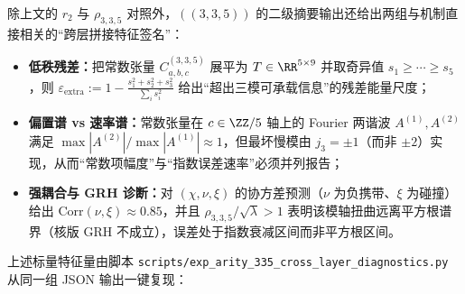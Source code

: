 \begin{remark}\label{rem:arity-335-cross-layer-diagnostics}
除上文的 \(r_2\) 与 \(\rho_{3,3,5}\) 对照外，\(((3,3,5))\) 的二级摘要输出还给出两组与机制直接相关的“跨层拼接特征签名”：
\begin{itemize}
  \item \textbf{低秩残差：}把常数张量 \(C^{(3,3,5)}_{a,b,c}\) 展平为 \(T\in\RR^{5\times 9}\) 并取奇异值 \(s_1\ge\cdots\ge s_5\)，则
  \(
  \varepsilon_{\mathrm{extra}}
  :=1-\frac{s_1^2+s_2^2+s_3^2}{\sum_i s_i^2}
  \)
  给出“超出三模可承载信息”的残差能量尺度；
  \item \textbf{偏置谱 vs 速率谱：}常数张量在 \(c\in\ZZ/5\) 轴上的 Fourier 两谐波 \(A^{(1)},A^{(2)}\) 满足 \(\max|A^{(2)}|/\max|A^{(1)}|\approx 1\)，但最坏慢模由 \(j_3=\pm 1\)（而非 \(\pm 2\)）实现，从而“常数项幅度”与“指数误差速率”必须并列报告；
  \item \textbf{强耦合与 GRH 诊断：}对 \((\chi,\nu,\xi)\) 的协方差预测（\(\nu\) 为负携带、\(\xi\) 为碰撞）给出 \(\mathrm{Corr}(\nu,\xi)\approx 0.85\)，并且 \(\rho_{3,3,5}/\sqrt{\lambda}>1\) 表明该模轴扭曲远离平方根谱界（核版 GRH 不成立），误差处于指数衰减区间而非平方根区间。
\end{itemize}
上述标量特征量由脚本 \texttt{scripts/exp\_arity\_335\_cross\_layer\_diagnostics.py} 从同一组 JSON 输出一键复现：

\end{remark}

